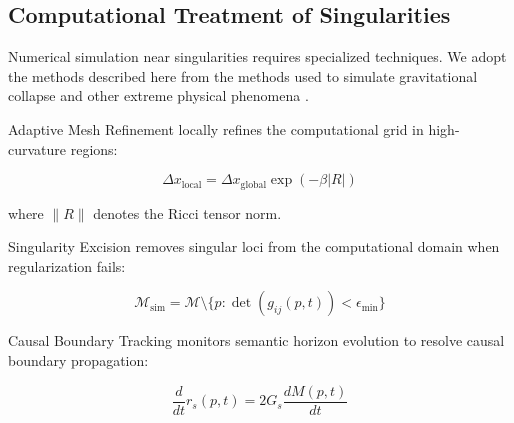 
\subsection{Computational Treatment of Singularities}
\label{12.2.3:computational_treatment_of_singularities}

Numerical simulation near singularities requires specialized techniques. We adopt the methods described here from the methods used to simulate gravitational collapse and other extreme physical phenomena \autocite{BaumgarteShapiro2010}.

Adaptive Mesh Refinement locally refines the computational grid in high-curvature regions:

\begin{equation}
\Delta x_{\text{local}} = \Delta x_{\text{global}} \exp(-\beta |R|)
\end{equation}

where \(\|R\|\) denotes the Ricci tensor norm.

Singularity Excision removes singular loci from the computational domain when regularization fails:

\begin{equation}
\mathcal{M}_{\text{sim}} = \mathcal{M} \setminus \{p : \det(g_{ij}(p, t)) < \epsilon_{\text{min}}\}
\end{equation}

Causal Boundary Tracking monitors semantic horizon evolution to resolve causal boundary propagation:

\begin{equation}
\frac{d}{dt} r_s(p, t) = 2G_s \frac{dM(p, t)}{dt}
\end{equation}